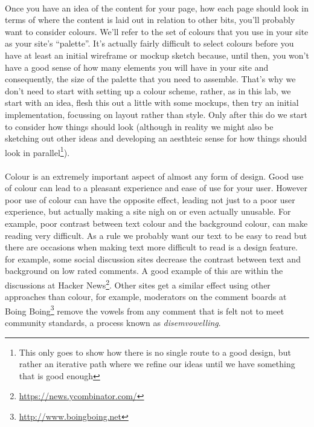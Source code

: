 \documentclass[10pt, a4paper, twosize]{article}
\begin{document}
\paragraph{} Once you have an idea of the content for your page, how each page should look in terms of where the content is laid out in relation to other bits, you'll probably want to consider colours. We'll refer to the set of colours that you use in your site as your site's ``palette''. It's actually fairly difficult to select colours before you have at least an initial wireframe or mockup sketch because, until then, you won't have a good sense of how many elements you will have in your site and consequently, the size of the palette that you need to assemble. That's why we don't need to start with setting up a colour scheme, rather, as in this lab, we start with an idea, flesh this out a little with some mockups, then try an initial implementation, focussing on layout rather than style. Only after this do we start to consider how things should look (although in reality we might also be sketching out other ideas and developing an aesthteic sense for how things should look in parallel\footnote{This only goes to show how there is no single route to a good design, but rather an iterative path where we refine our ideas until we have something that is good enough}).

\paragraph{} Colour is an extremely important aspect of almost any form of design. Good use of colour can lead to a pleasant experience and ease of use for your user. However poor use of colour can have the opposite effect, leading not just to a poor user experience, but actually making a site nigh on or even actually unusable. For example, poor contrast between text colour and the background colour, can make reading very difficult. As a rule we probably want our text to be easy to read but there are occasions when making text more difficult to read is a design feature. for example, some social discussion sites decrease the contrast between text and background on low rated comments. A good example of this are within the discussions at Hacker News\footnote{\url{https://news.ycombinator.com/}}. Other sites get a similar effect using other approaches than colour, for example, moderators on the comment boards at Boing Boing\footnote{\url{http://www.boingboing.net}} remove the vowels from any comment that is felt not to meet community standards, a process known as \emph{disemvowelling}.
\end{document}
